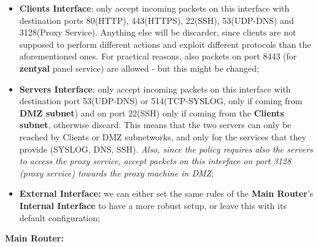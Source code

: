 \begin{itemize}
\item \textbf{Clients Interface}: only accept incoming packets on this interface with destination ports 80(HTTP), 443(HTTPS), 22(SSH), 53(UDP-DNS) and 3128(Proxy Service). Anything else will be discarder, since clients are not supposed to perform different actions and exploit different protocols than the aforementioned ones. For practical reasons, also packets on port 8443 (for \textbf{zentyal} panel service) are allowed - but this might be changed;
\item \textbf{Servers Interface}: only accept incoming packets on this interface with destination port 53(UDP-DNS) or 514(TCP-SYSLOG, only if coming from \textbf{DMZ subnet}) and on port 22(SSH) only if coming from the \textbf{Clients subnet}, otherwise discard. This means that the two servers can only be reached by Clients or DMZ subnetworks, and only for the services that they provide (SYSLOG, DNS, SSH). \textit{Also, since the policy requires also the servers to access the proxy service, accept packets on this interface on port 3128 (proxy service) towards the proxy machine in DMZ};
\item \textbf{External Interface:} we can either set the same rules of the \textbf{Main Router}'s \textbf{Internal Interface} to have a more robust setup, or leave this with its default configuration;
\end{itemize}
\textbf{Main Router:}
